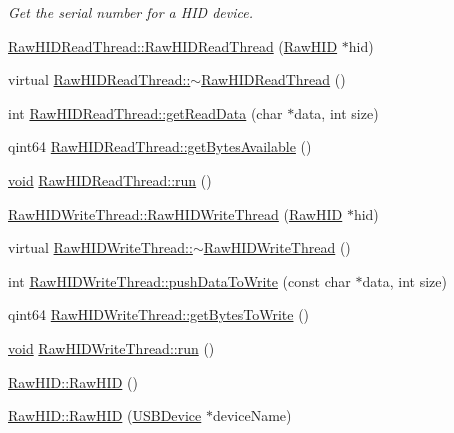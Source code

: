 \begin{DoxyCompactItemize}
\begin{DoxyCompactList}\small\item\em \-Get the serial number for a \-H\-I\-D device. \end{DoxyCompactList}\item 
\hyperlink{group___raw_h_i_d_plugin_ga4a906f373d862e82a9c6972a5144a9ce}{\-Raw\-H\-I\-D\-Read\-Thread\-::\-Raw\-H\-I\-D\-Read\-Thread} (\hyperlink{class_raw_h_i_d}{\-Raw\-H\-I\-D} $\ast$hid)
\item 
virtual \hyperlink{group___raw_h_i_d_plugin_ga39a7dfe6227270e9721fb326ed792805}{\-Raw\-H\-I\-D\-Read\-Thread\-::$\sim$\-Raw\-H\-I\-D\-Read\-Thread} ()
\item 
int \hyperlink{group___raw_h_i_d_plugin_gaa619bfb605e0c07b6a33147d451490cb}{\-Raw\-H\-I\-D\-Read\-Thread\-::get\-Read\-Data} (char $\ast$data, int size)
\item 
qint64 \hyperlink{group___raw_h_i_d_plugin_ga7a009b110ddd862add0a221ad4072e75}{\-Raw\-H\-I\-D\-Read\-Thread\-::get\-Bytes\-Available} ()
\item 
\hyperlink{group___u_a_v_objects_plugin_ga444cf2ff3f0ecbe028adce838d373f5c}{void} \hyperlink{group___raw_h_i_d_plugin_ga1f533b47a0fb6382c542a4fa5b344d2a}{\-Raw\-H\-I\-D\-Read\-Thread\-::run} ()
\item 
\hyperlink{group___raw_h_i_d_plugin_gac9c8ee05f180a569c664780b9760849e}{\-Raw\-H\-I\-D\-Write\-Thread\-::\-Raw\-H\-I\-D\-Write\-Thread} (\hyperlink{class_raw_h_i_d}{\-Raw\-H\-I\-D} $\ast$hid)
\item 
virtual \hyperlink{group___raw_h_i_d_plugin_gaf760c0fa4d7799e982c74e1b6aaba378}{\-Raw\-H\-I\-D\-Write\-Thread\-::$\sim$\-Raw\-H\-I\-D\-Write\-Thread} ()
\item 
int \hyperlink{group___raw_h_i_d_plugin_ga563f2214706aafbf75b158b6ca2ed73e}{\-Raw\-H\-I\-D\-Write\-Thread\-::push\-Data\-To\-Write} (const char $\ast$data, int size)
\item 
qint64 \hyperlink{group___raw_h_i_d_plugin_ga33316914e9994a7ee878bffe07175781}{\-Raw\-H\-I\-D\-Write\-Thread\-::get\-Bytes\-To\-Write} ()
\item 
\hyperlink{group___u_a_v_objects_plugin_ga444cf2ff3f0ecbe028adce838d373f5c}{void} \hyperlink{group___raw_h_i_d_plugin_gaac9f3dfe020b10edc1c5677e07b36d04}{\-Raw\-H\-I\-D\-Write\-Thread\-::run} ()
\item 
\hyperlink{group___raw_h_i_d_plugin_gab8670136473a97cded80dd1a4e785680}{\-Raw\-H\-I\-D\-::\-Raw\-H\-I\-D} ()
\item 
\hyperlink{group___raw_h_i_d_plugin_gae7f570657448daa4890a0e38f693e6ed}{\-Raw\-H\-I\-D\-::\-Raw\-H\-I\-D} (\hyperlink{class_u_s_b_device}{\-U\-S\-B\-Device} $\ast$device\-Name)

\end{DoxyCompactItemize}
